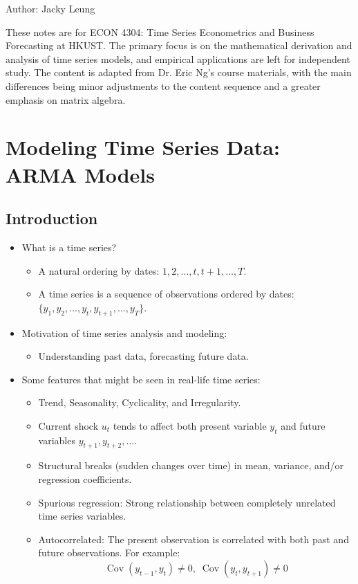 \documentclass[notitlepage]{article}
\DeclareMathOperator{\Cov}{Cov}
\begin{document}
Author: Jacky Leung

These notes are for ECON 4304: Time Series Econometrics and Business Forecasting at HKUST. The primary focus is on the mathematical derivation and analysis of time series models, and empirical applications are left for independent study. The content is adapted from Dr. Eric Ng's course materials, with the main differences being minor adjustments to the content sequence and a greater emphasis on matrix algebra.

\section{Modeling Time Series Data: ARMA Models}

\subsection{Introduction}

\begin{itemize}
    \item What is a time series?
    \begin{itemize}
        \item A natural ordering by dates: $1, 2, \dots, t, t+1, \dots, T$.
        \item A time series is a sequence of observations ordered by dates: \(\{y_1, y_2, \dots, y_t, y_{t+1}, \dots, y_T\}\).
    \end{itemize}
    \item Motivation of time series analysis and modeling:
    \begin{itemize}
        \item Understanding past data, forecasting future data.
    \end{itemize}
    \item Some features that might be seen in real-life time series:
    \begin{itemize}
        \item Trend, Seasonality, Cyclicality, and Irregularity.
        \item Current shock \(u_t\) tends to affect both present variable \(y_t\) and future variables \(y_{t+1}, y_{t+2}, \dots\).
        \item Structural breaks (sudden changes over time) in mean, variance, and/or regression coefficients.
        \item Spurious regression: Strong relationship between completely unrelated time series variables.
        \item Autocorrelated: The present observation is correlated with both past and future observations. For example:
        \[
        \Cov(y_{t-1}, y_t) \ne 0, \; \Cov(y_t, y_{t+1}) \ne 0
        \]
    \end{itemize}
\end{itemize}
\end{document}
